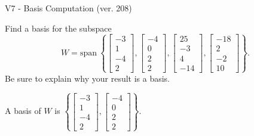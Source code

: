 \begin{exercise}
  \begin{exerciseTitle}V7 - Basis Computation (ver. 208)\end{exerciseTitle}
  \begin{exerciseStatement}
    Find a basis for the subspace 
\[W=\mathrm{span}\ \left\{\left[\begin{array}{r}
-3 \\
1 \\
-4 \\
2
\end{array}\right] , \left[\begin{array}{r}
-4 \\
0 \\
2 \\
2
\end{array}\right] , \left[\begin{array}{r}
25 \\
-3 \\
4 \\
-14
\end{array}\right] , \left[\begin{array}{r}
-18 \\
2 \\
-2 \\
10
\end{array}\right]\right\}.\]
 Be sure to explain why your result is a basis.


  \end{exerciseStatement}
  \begin{exerciseAnswer}
   A basis of \(W\) is  \(\left\{\left[\begin{array}{r}
-3 \\
1 \\
-4 \\
2
\end{array}\right] , \left[\begin{array}{r}
-4 \\
0 \\
2 \\
2
\end{array}\right]\right\}\).
  


  \end{exerciseAnswer}
\end{exercise}